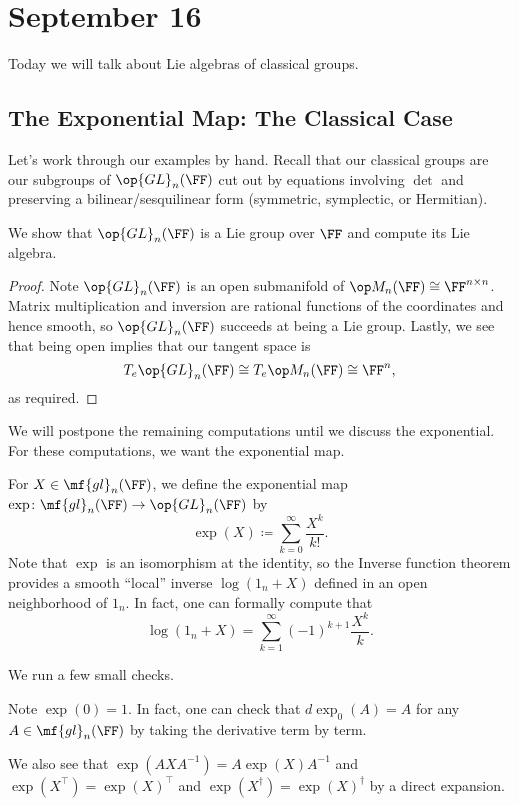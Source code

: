 \documentclass[../notes.tex]{subfiles}
\begin{document}
\section{September 16}
Today we will talk about Lie algebras of classical groups.

\subsection{The Exponential Map: The Classical Case}
Let's work through our examples by hand. Recall that our classical groups are our subgroups of $\op{GL}_n(\FF)$ cut out by equations involving $\det$ and preserving a bilinear/sesquilinear form (symmetric, symplectic, or Hermitian).
\begin{example}
	We show that $\op{GL}_n(\FF)$ is a Lie group over $\FF$ and compute its Lie algebra.
\end{example}
\begin{proof}
	Note $\op{GL}_n(\FF)$ is an open submanifold of $\op M_n(\FF)\cong\FF^{n\times n}$. Matrix multiplication and inversion are rational functions of the coordinates and hence smooth, so $\op{GL}_n(\FF)$ succeeds at being a Lie group. Lastly, we see that being open implies that our tangent space is
	\[T_e\op{GL}_n(\FF)\cong T_e\op M_n(\FF)\cong\FF^n,\]
	as required.
\end{proof}
We will postpone the remaining computations until we discuss the exponential.
For these computations, we want the exponential map.
\begin{definition}[exponential]
	For $X\in\mf{gl}_n(\FF)$, we define the exponential map $\exp\colon\mf{gl}_n(\FF)\to\op{GL}_n(\FF)$ by
	\[\exp(X)\coloneqq\sum_{k=0}^\infty\frac{X^k}{k!}.\]
	Note that $\exp$ is an isomorphism at the identity, so the Inverse function theorem provides a smooth ``local'' inverse $\log(1_n+X)$ defined in an open neighborhood of $1_n$. In fact, one can formally compute that
	\[\log(1_n+X)=\sum_{k=1}^\infty(-1)^{k+1}\frac{X^k}k.\]
\end{definition}
We run a few small checks.
\begin{remark}
	Note $\exp(0)=1$. In fact, one can check that $d\exp_0(A)=A$ for any $A\in\mf{gl}_n(\FF)$ by taking the derivative term by term.
\end{remark}
\begin{remark} \label{rem:manipulate-in-exp}
	We also see that $\exp\left(AXA^{-1}\right)=A\exp(X)A^{-1}$ and $\exp(X^\intercal)=\exp(X)^\intercal$ and $\exp(X^\dagger)=\exp(X)^\dagger$ by a direct expansion.
\end{remark}
\end{document}
